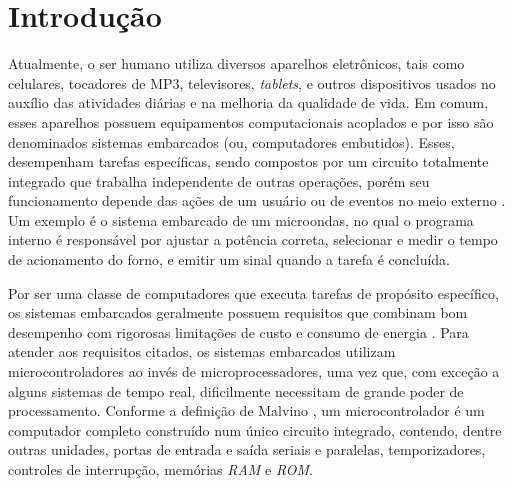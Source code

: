 
\chapter{Introdução} \label{Cap:Introducao}

Atualmente, o ser humano utiliza diversos aparelhos eletrônicos, tais como celulares, tocadores de MP3, televisores, \textit{tablets}, e outros dispositivos usados no auxílio das atividades diárias e na melhoria da qualidade de vida. Em comum, esses aparelhos possuem equipamentos computacionais acoplados e por isso são denominados sistemas embarcados (ou, computadores embutidos). Esses, desempenham tarefas específicas, sendo compostos por um circuito totalmente integrado que trabalha independente de outras operações, porém seu funcionamento depende das ações de um usuário ou de eventos no meio externo \cite{SistemasEmb:2014}. Um exemplo é o sistema embarcado de um microondas, no qual o programa interno é responsável por ajustar a potência correta, selecionar e medir o tempo de acionamento do forno, e emitir um sinal quando a tarefa é concluída.

Por ser uma classe de computadores que executa tarefas de propósito específico, os sistemas embarcados geralmente possuem requisitos que combinam bom desempenho com rigorosas limitações de custo e consumo de energia \cite{Kruger:2014}. Para atender aos requisitos citados, os sistemas embarcados utilizam microcontroladores ao invés de microprocessadores, uma vez que, com exceção a alguns sistemas de tempo real, dificilmente necessitam de grande poder de processamento. Conforme a definição de Malvino \cite{Malvino:1985}, um microcontrolador é um computador completo construído num único circuito integrado, contendo, dentre outras unidades, portas de entrada e saída seriais e paralelas, temporizadores, controles de interrupção, memórias \textit{RAM} e \textit{ROM}. 

